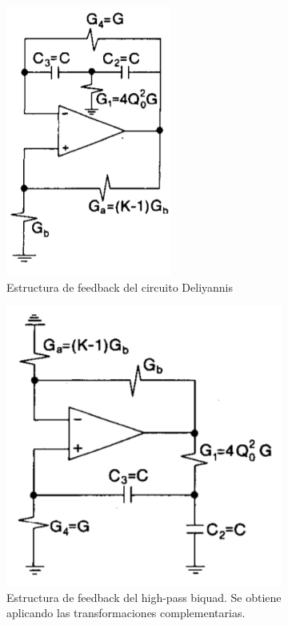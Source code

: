 \documentclass[../../tc_tp5_main.tex]{subfiles}
\begin{document}
\begin{figure}[H]	%
	\centering
	\begin{subfigure}[t]{0.47\textwidth}
		\centering
		\includegraphics[width=0.6\textwidth]{imagenes/Deliyannis_feedback_structure.png}
		\caption{Estructura de feedback del circuito Deliyannis}
		\label{fig:ej3_feedback_structure_deliyannis}
	\end{subfigure}%
	\hfill
	\begin{subfigure}[t]{0.47\textwidth}
		\centering
		\includegraphics[width=\textwidth]{imagenes/sedra_HPB_feedback_structure.png}
		\caption{Estructura de feedback del high-pass biquad. Se obtiene aplicando las transformaciones complementarias.}
		\label{fig:ej3_feedback_structure_hpb}
	\end{subfigure}	
	\caption{}
	\label{fig:ej3_feedback_structure}
\end{figure}
\end{document}
